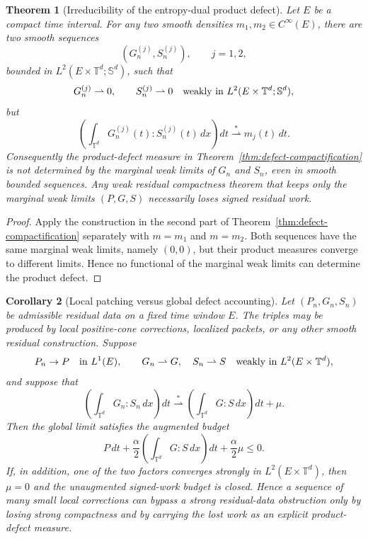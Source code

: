 \documentclass[11pt]{article}
\numberwithin{equation}{section}
\newtheorem{theorem}{Theorem}[section]
\newtheorem{corollary}[theorem]{Corollary}
\newcommand{\T}{\mathbb T}
\newcommand{\Sym}{\mathbb S}
\begin{document}
\begin{theorem}[Irreducibility of the entropy-dual product defect]
\label{thm:irreducible-product-defect}
Let \(E\) be a compact time interval.  For any two smooth densities
\(m_1,m_2\in C^\infty(E)\), there are two smooth sequences
\[
  (G_n^{(j)},S_n^{(j)}),\qquad j=1,2,
\]
bounded in \(L^2(E\times\T^d;\Sym^d)\), such that
\[
  G_n^{(j)}\rightharpoonup0,\qquad
  S_n^{(j)}\rightharpoonup0
  \quad\hbox{weakly in }L^2(E\times\T^d;\Sym^d),
\]
but
\[
  \left(\int_{\T^d}G_n^{(j)}(t):S_n^{(j)}(t)\,dx\right)dt
  \stackrel{*}{\rightharpoonup}m_j(t)\,dt .
\]
Consequently the product-defect measure in
Theorem~\ref{thm:defect-compactification} is not determined by the marginal
weak limits of \(G_n\) and \(S_n\), even in smooth bounded sequences.  Any
weak residual compactness theorem that keeps only the marginal weak limits
\((P,G,S)\) necessarily loses signed residual work.
\end{theorem}

\begin{proof}
Apply the construction in the second part of
Theorem~\ref{thm:defect-compactification} separately with \(m=m_1\) and
\(m=m_2\).  Both sequences have the same marginal weak limits, namely
\((0,0)\), but their product measures converge to different limits.  Hence no
functional of the marginal weak limits can determine the product defect.
\end{proof}

\begin{corollary}[Local patching versus global defect accounting]
\label{cor:local-global-defect-accounting}
Let \((P_n,G_n,S_n)\) be admissible residual data on a fixed time window \(E\).
The triples may be produced by local positive-cone corrections, localized
packets, or any other smooth residual construction.  Suppose
\[
  P_n\to P\quad\hbox{in }L^1(E),\qquad
  G_n\rightharpoonup G,\quad S_n\rightharpoonup S
  \quad\hbox{weakly in }L^2(E\times\T^d),
\]
and suppose that
\[
  \left(\int_{\T^d}G_n:S_n\,dx\right)dt
  \stackrel{*}{\rightharpoonup}
  \left(\int_{\T^d}G:S\,dx\right)dt+\mu .
\]
Then the global limit satisfies the augmented budget
\begin{equation}
  P\,dt+\frac{\alpha}{2}
  \left(\int_{\T^d}G:S\,dx\right)dt
  +\frac{\alpha}{2}\mu\le0 .
  \label{eq:local-global-augmented-budget}
\end{equation}
If, in addition, one of the two factors converges strongly in
\(L^2(E\times\T^d)\), then \(\mu=0\) and the unaugmented signed-work budget is
closed.  Hence a sequence of many small local corrections can bypass a strong
residual-data obstruction only by losing strong compactness and by carrying the
lost work as an explicit product-defect measure.
\end{corollary}
\end{document}
